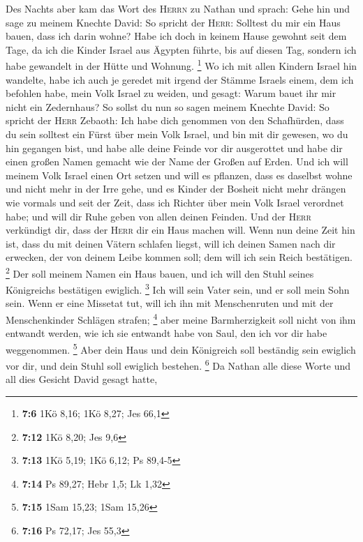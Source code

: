  Des Nachts aber kam das Wort des \textsc{Herrn} zu Nathan
und sprach:  Gehe hin und sage zu meinem Knechte David: So
spricht der \textsc{Herr}: Solltest du mir ein Haus bauen, dass ich
darin wohne?  Habe ich doch in keinem Hause gewohnt seit
dem Tage, da ich die Kinder Israel aus Ägypten führte, bis auf diesen
Tag, sondern ich habe gewandelt in der Hütte und Wohnung. \footnote{\textbf{7:6}
  1Kö 8,16; 1Kö 8,27; Jes 66,1}  Wo ich mit allen Kindern
Israel hin wandelte, habe ich auch je geredet mit irgend der Stämme
Israels einem, dem ich befohlen habe, mein Volk Israel zu weiden, und
gesagt: Warum bauet ihr mir nicht ein Zedernhaus?  So
sollst du nun so sagen meinem Knechte David: So spricht der
\textsc{Herr} Zebaoth: Ich habe dich genommen von den Schafhürden, dass
du sein solltest ein Fürst über mein Volk Israel,  und bin
mit dir gewesen, wo du hin gegangen bist, und habe alle deine Feinde vor
dir ausgerottet und habe dir einen großen Namen gemacht wie der Name der
Großen auf Erden.  Und ich will meinem Volk Israel einen
Ort setzen und will es pflanzen, dass es daselbst wohne und nicht mehr
in der Irre gehe, und es Kinder der Bosheit nicht mehr drängen wie
vormals und seit der Zeit, dass ich Richter über mein Volk Israel
verordnet habe;  und will dir Ruhe geben von allen deinen
Feinden. Und der \textsc{Herr} verkündigt dir, dass der \textsc{Herr}
dir ein Haus machen will.  Wenn nun deine Zeit hin ist,
dass du mit deinen Vätern schlafen liegst, will ich deinen Samen nach
dir erwecken, der von deinem Leibe kommen soll; dem will ich sein Reich
bestätigen. \footnote{\textbf{7:12} 1Kö 8,20; Jes 9,6} 
Der soll meinem Namen ein Haus bauen, und ich will den Stuhl seines
Königreichs bestätigen ewiglich. \footnote{\textbf{7:13} 1Kö 5,19; 1Kö
  6,12; Ps 89,4-5}  Ich will sein Vater sein, und er soll
mein Sohn sein. Wenn er eine Missetat tut, will ich ihn mit
Menschenruten und mit der Menschenkinder Schlägen strafen; \footnote{\textbf{7:14}
  Ps 89,27; Hebr 1,5; Lk 1,32}  aber meine Barmherzigkeit
soll nicht von ihm entwandt werden, wie ich sie entwandt habe von Saul,
den ich vor dir habe weggenommen. \footnote{\textbf{7:15} 1Sam 15,23;
  1Sam 15,26}  Aber dein Haus und dein Königreich soll
beständig sein ewiglich vor dir, und dein Stuhl soll ewiglich bestehen.
\footnote{\textbf{7:16} Ps 72,17; Jes 55,3}  Da Nathan
alle diese Worte und all dies Gesicht David gesagt hatte,

